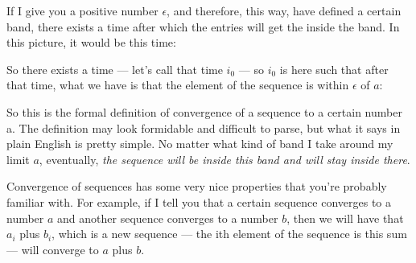\documentclass[pdftex, brazil, 12pt, twoside]{article}
\begin{document}
If I give you a positive number $\epsilon$, and therefore,
this way, have defined a certain band, there exists a
time after which the entries will get the inside the band.
In this picture, it would be this time:

\begin{figure}[H]
  \begin{center}
  \end{center}
\end{figure}

So there exists a time ---
let's call that time $i_0$ ---
so $i_0$ is here such that after that time, what we have is
that the element of the sequence is
within $\epsilon$ of $a$:

\begin{figure}[H]
  \begin{center}
  \end{center}
\end{figure}

So this is the formal definition of convergence of a
sequence to a certain number a.
The definition may look formidable and difficult to
parse, but what it says in plain
English is pretty simple.
No matter what kind of band I take around my limit $a$,
eventually, \emph{the sequence will be inside this band and will
stay inside there}.

Convergence of sequences has some very nice properties that
you're probably familiar with.
For example, if I tell you that a certain sequence
converges to a number $a$ and another sequence converges to
a number $b$, then we will have that $a_i$ plus $b_i$, which is a
new sequence ---
the ith element of the sequence is this sum ---
will converge to $a$ plus $b$.
\end{document}
